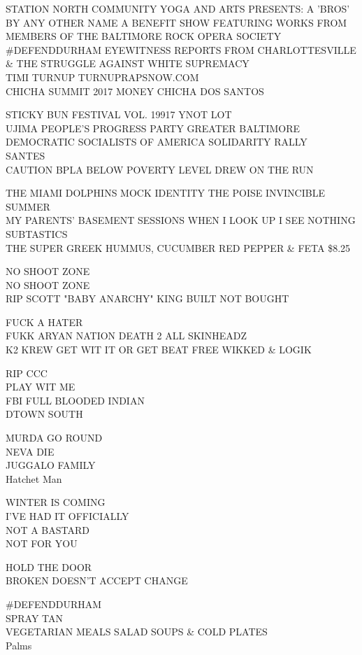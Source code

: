 \documentclass[10pt,letterpaper]{article}
\begin{document}
STATION NORTH COMMUNITY YOGA AND ARTS PRESENTS: A 'BROS' BY ANY OTHER NAME A BENEFIT SHOW FEATURING WORKS FROM MEMBERS OF THE BALTIMORE ROCK OPERA SOCIETY\\
\#DEFENDDURHAM EYEWITNESS REPORTS FROM CHARLOTTESVILLE \& THE STRUGGLE AGAINST WHITE SUPREMACY\\
TIMI TURNUP TURNUPRAPSNOW.COM\\
CHICHA SUMMIT 2017 MONEY CHICHA DOS SANTOS

STICKY BUN FESTIVAL VOL. 19917 YNOT LOT\\
UJIMA PEOPLE'S PROGRESS PARTY GREATER BALTIMORE DEMOCRATIC SOCIALISTS OF AMERICA SOLIDARITY RALLY\\
SANTES\\
CAUTION BPLA BELOW POVERTY LEVEL DREW ON THE RUN

THE MIAMI DOLPHINS MOCK IDENTITY THE POISE INVINCIBLE SUMMER\\
MY PARENTS' BASEMENT SESSIONS WHEN I LOOK UP I SEE NOTHING\\
SUBTASTICS\\
THE SUPER GREEK HUMMUS, CUCUMBER RED PEPPER \& FETA \$8.25

NO SHOOT ZONE\\
NO SHOOT ZONE\\
RIP SCOTT "BABY ANARCHY" KING BUILT NOT BOUGHT

FUCK A HATER\\
FUKK ARYAN NATION DEATH 2 ALL SKINHEADZ\\
K2 KREW GET WIT IT OR GET BEAT FREE WIKKED \& LOGIK

RIP CCC\\
PLAY WIT ME\\
FBI FULL BLOODED INDIAN\\
DTOWN SOUTH

MURDA GO ROUND\\
NEVA DIE\\
JUGGALO FAMILY\\
Hatchet Man

WINTER IS COMING\\
I'VE HAD IT OFFICIALLY\\
NOT A BASTARD\\
NOT FOR YOU

HOLD THE DOOR\\
BROKEN DOESN'T ACCEPT CHANGE

\#DEFENDDURHAM\\
SPRAY TAN\\
VEGETARIAN MEALS SALAD SOUPS \& COLD PLATES\\
Palms
\end{document}
